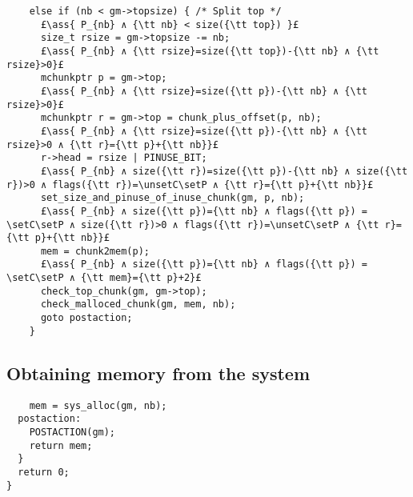 \documentclass[10pt,a4paper,twoside]{report}
\makeatletter
\newcommand{\ml}[2][t]{\mbox{\mdseries\begin{tabular}[#1]{@{}L@{}}#2\end{tabular}}}
\newcommand{\ass}[1]{\ensuremath{{\color{blue}\left\{\ml[c]{#1}\right\}}}}
\newcommand{\setC}{\raisebox{1.5pt}{$\blacktriangledown$}}
\newcommand{\unsetC}{\raisebox{1.5pt}{$\triangledown$}}
\newcommand{\setP}{{\blacktriangle}}
\makeatother
\begin{document}
\begin{lstlisting}
    else if (nb < gm->topsize) { /* Split top */
      £\ass{ P_{nb} ∧ {\tt nb} < size({\tt top}) }£
      size_t rsize = gm->topsize -= nb;
      £\ass{ P_{nb} ∧ {\tt rsize}=size({\tt top})-{\tt nb} ∧ {\tt rsize}>0}£
      mchunkptr p = gm->top;
      £\ass{ P_{nb} ∧ {\tt rsize}=size({\tt p})-{\tt nb} ∧ {\tt rsize}>0}£
      mchunkptr r = gm->top = chunk_plus_offset(p, nb);
      £\ass{ P_{nb} ∧ {\tt rsize}=size({\tt p})-{\tt nb} ∧ {\tt rsize}>0 ∧ {\tt r}={\tt p}+{\tt nb}}£
      r->head = rsize | PINUSE_BIT;
      £\ass{ P_{nb} ∧ size({\tt r})=size({\tt p})-{\tt nb} ∧ size({\tt r})>0 ∧ flags({\tt r})=\unsetC\setP ∧ {\tt r}={\tt p}+{\tt nb}}£
      set_size_and_pinuse_of_inuse_chunk(gm, p, nb);
      £\ass{ P_{nb} ∧ size({\tt p})={\tt nb} ∧ flags({\tt p}) = \setC\setP ∧ size({\tt r})>0 ∧ flags({\tt r})=\unsetC\setP ∧ {\tt r}={\tt p}+{\tt nb}}£
      mem = chunk2mem(p);
      £\ass{ P_{nb} ∧ size({\tt p})={\tt nb} ∧ flags({\tt p}) = \setC\setP ∧ {\tt mem}={\tt p}+2}£
      check_top_chunk(gm, gm->top);
      check_malloced_chunk(gm, mem, nb);
      goto postaction;
    }
\end{lstlisting}

\subsection*{Obtaining memory from the system}

\begin{lstlisting}
    mem = sys_alloc(gm, nb);
  postaction:
    POSTACTION(gm);
    return mem;
  }
  return 0;
}
\end{lstlisting}

\end{document}
